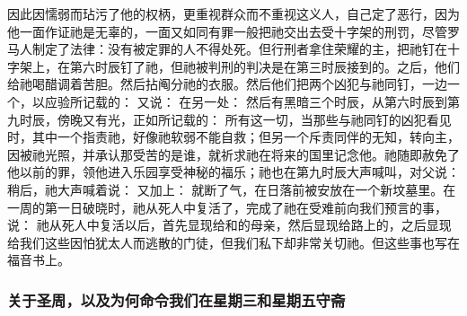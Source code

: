 因此因懦弱而玷污了他的权柄，更重视群众而不重视这义人，自己定了恶行，因为他一面作证祂是无辜的，一面又如同有罪一般把祂交出去受十字架的刑罚，尽管罗马人制定了法律：没有被定罪的人不得处死。但行刑者拿住荣耀的主，把祂钉在十字架上，在第六时辰钉了祂，但祂被判刑的判决是在第三时辰接到的。之后，他们给祂喝醋调着苦胆。然后拈阄分祂的衣服。然后他们把两个凶犯与祂同钉，一边一个，以应验所记载的： 又说： 在另一处：  然后有黑暗三个时辰，从第六时辰到第九时辰，傍晚又有光，正如所记载的： 所有这一切，当那些与祂同钉的凶犯看见时，其中一个指责祂，好像祂软弱不能自救；但另一个斥责同伴的无知，转向主，因被祂光照，并承认那受苦的是谁，就祈求祂在将来的国里记念他。祂随即赦免了他以前的罪，领他进入乐园享受神秘的福乐；祂也在第九时辰大声喊叫，对父说： 稍后，祂大声喊着说： 又加上： 就断了气，在日落前被安放在一个新坟墓里。在一周的第一日破晓时，祂从死人中复活了，完成了祂在受难前向我们预言的事，说： 祂从死人中复活以后，首先显现给和的母亲，然后显现给路上的，之后显现给我们这些因怕犹太人而逃散的门徒，但我们私下却非常关切祂。但这些事也写在福音书上。\par


\subsubsection{关于圣周，以及为何命令我们在星期三和星期五守斋}

